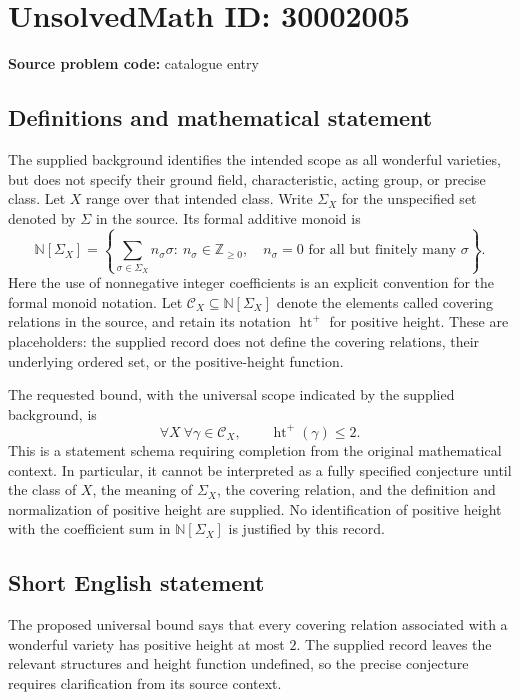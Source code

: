 \documentclass[11pt]{article}
\begin{document}
\section*{UnsolvedMath ID: 30002005}
\textbf{Source problem code:} catalogue entry
\subsection{Definitions and mathematical statement}
The supplied background identifies the intended scope as all wonderful varieties, but does not specify their ground field, characteristic, acting group, or precise class. Let \(X\) range over that intended class. Write \(\Sigma_X\) for the unspecified set denoted by \(\Sigma\) in the source. Its formal additive monoid is
\[
\mathbb N[\Sigma_X]=\left\{\sum_{\sigma\in\Sigma_X}n_\sigma\sigma:\ n_\sigma\in\mathbb Z_{\geq 0},\quad n_\sigma=0\text{ for all but finitely many }\sigma\right\}.
\]
Here the use of nonnegative integer coefficients is an explicit convention for the formal monoid notation. Let \(\mathcal C_X\subseteq\mathbb N[\Sigma_X]\) denote the elements called covering relations in the source, and retain its notation \(\operatorname{ht}^{+}\) for positive height. These are placeholders: the supplied record does not define the covering relations, their underlying ordered set, or the positive-height function.

The requested bound, with the universal scope indicated by the supplied background, is
\[
\forall X\ \forall\gamma\in\mathcal C_X,\qquad \operatorname{ht}^{+}(\gamma)\leq 2.
\]
This is a statement schema requiring completion from the original mathematical context. In particular, it cannot be interpreted as a fully specified conjecture until the class of \(X\), the meaning of \(\Sigma_X\), the covering relation, and the definition and normalization of positive height are supplied. No identification of positive height with the coefficient sum in \(\mathbb N[\Sigma_X]\) is justified by this record.
\subsection{Short English statement}
The proposed universal bound says that every covering relation associated with a wonderful variety has positive height at most \(2\). The supplied record leaves the relevant structures and height function undefined, so the precise conjecture requires clarification from its source context.
\end{document}
